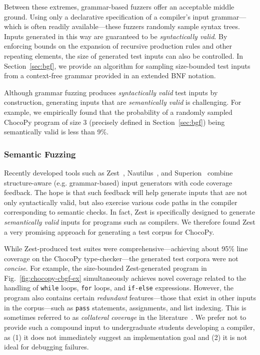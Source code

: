 \documentclass[conference]{IEEEtran}
\newcommand{\code}{\texttt}
\begin{document}
Between these extremes, grammar-based fuzzers offer an acceptable middle ground. Using only a declarative specification of a compiler's input grammar---which is often readily available---these fuzzers randomly sample syntax trees. Inputs generated in this way are guaranteed to be \emph{syntactically valid}. By enforcing bounds on the expansion of recursive production rules and other repeating elements, the size of generated test inputs can also be controlled. In Section~\ref{sec:bgf}, we provide an algorithm for sampling size-bounded test inputs from a context-free grammar provided in an extended BNF notation.

Although grammar fuzzing produces \emph{syntactically valid} test inputs by construction, generating inputs that are \emph{semantically valid} is challenging. For example, we empirically found that the probability of a randomly sampled ChocoPy program of size 3 (precisely defined in Section~\ref{sec:bgf}) being semantically valid is less than 9\%. 

\subsubsection{Semantic Fuzzing}

Recently developed tools such as Zest~\cite{Padhye19-zest},  Nautilus~\cite{Aschermann19}, and Superion~\cite{Wang19} combine structure-aware (e.g. grammar-based) input generators with code coverage feedback. The hope is that such feedback will help generate inputs that are not only syntactically valid, but also exercise various code paths in the compiler corresponding to semantic checks. In fact, Zest is specifically designed to generate \emph{semantically valid} inputs for programs such as compilers. We therefore found Zest a very promising approach for generating a test corpus for ChocoPy.

While Zest-produced test suites were comprehensive---achieving about 95\% line coverage on the ChocoPy type-checker---the generated test corpora were not \emph{concise}. 
For example, the size-bounded Zest-generated program in Fig.~\ref{fig:chocopy-cbgf-ex} simultaneously achieves novel coverage related to the handling of \code{while} loops, \code{for} loops, and \code{if-else} expressions. However, the program also contains certain \emph{redundant} features---those that exist in other inputs in the corpus---such as \code{pass} statements, assignments, and list indexing. This is sometimes referred to as \emph{collateral coverage} in the literature~\cite{Harman10}. We prefer not to provide such a compound input to undergraduate students developing a compiler, as (1) it does not immediately suggest an implementation goal and (2) it is not ideal for debugging failures.
\end{document}
